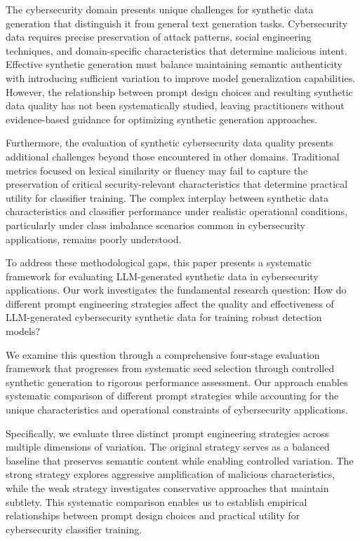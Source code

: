 The cybersecurity domain presents unique challenges for synthetic data generation that distinguish it from general text generation tasks. Cybersecurity data requires precise preservation of attack patterns, social engineering techniques, and domain-specific characteristics that determine malicious intent. Effective synthetic generation must balance maintaining semantic authenticity with introducing sufficient variation to improve model generalization capabilities. However, the relationship between prompt design choices and resulting synthetic data quality has not been systematically studied, leaving practitioners without evidence-based guidance for optimizing synthetic generation approaches.

Furthermore, the evaluation of synthetic cybersecurity data quality presents additional challenges beyond those encountered in other domains. Traditional metrics focused on lexical similarity or fluency may fail to capture the preservation of critical security-relevant characteristics that determine practical utility for classifier training. The complex interplay between synthetic data characteristics and classifier performance under realistic operational conditions, particularly under class imbalance scenarios common in cybersecurity applications, remains poorly understood.

To address these methodological gaps, this paper presents a systematic framework for evaluating LLM-generated synthetic data in cybersecurity applications. Our work investigates the fundamental research question: How do different prompt engineering strategies affect the quality and effectiveness of LLM-generated cybersecurity synthetic data for training robust detection models?

We examine this question through a comprehensive four-stage evaluation framework that progresses from systematic seed selection through controlled synthetic generation to rigorous performance assessment. Our approach enables systematic comparison of different prompt strategies while accounting for the unique characteristics and operational constraints of cybersecurity applications.

Specifically, we evaluate three distinct prompt engineering strategies across multiple dimensions of variation. The original strategy serves as a balanced baseline that preserves semantic content while enabling controlled variation. The strong strategy explores aggressive amplification of malicious characteristics, while the weak strategy investigates conservative approaches that maintain subtlety. This systematic comparison enables us to establish empirical relationships between prompt design choices and practical utility for cybersecurity classifier training.

